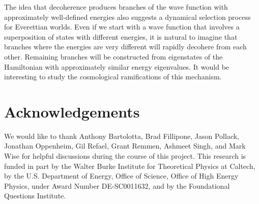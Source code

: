 \documentclass[12pt,aps,prd,onecolumn,nofootinbib,notitlepage]{revtex4-1}
\begin{document}
The idea that decoherence produces branches of the wave function with approximately well-defined energies also suggests a dynamical selection process for Everettian worlds.
Even if we start with a wave function that involves a superposition of states with different energies, it is natural to imagine that branches where the energies are very different will rapidly decohere from each other.
Remaining branches will be constructed from eigenstates of the Hamiltonian with approximately similar energy eigenvalues.
It would be interesting to study the cosmological ramifications of this mechanism.



\section*{Acknowledgements}
We would like to thank Anthony Bartolotta, Brad Fillipone, Jason Pollack, Jonathan Oppenheim, Gil Refael, Grant Remmen, Ashmeet Singh, and Mark Wise for helpful discussions during the course of this project. This research is funded in part by the Walter Burke Institute for Theoretical Physics at Caltech, by the U.S. Department of Energy, Office of Science, Office of High Energy Physics, under Award Number DE-SC0011632, and by the Foundational Questions Institute.




\end{document}
